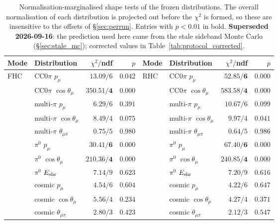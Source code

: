 \documentclass[11pt,a4paper]{article}
\begin{document}
\begin{table}[H]
  \centering
  \caption{Normalisation-marginalised shape tests of the frozen distributions. The overall
    normalisation of each distribution is projected out before the $\chi^2$ is formed, so
    these are insensitive to the offsets of \S\ref{sec:perrun}. Entries with $p<0.01$ in
    bold. \textbf{Superseded 2026-09-16}: the prediction used here came from the stale sideband Monte Carlo
    (\S\ref{sec:stale_mc}); corrected values in Table~\ref{tab:protocol_corrected}.}
  \label{tab:shape}
  \small
  \begin{tabular}{llrr|llrr}
    \toprule
    Mode & Distribution & $\chi^2/$ndf & $p$ & Mode & Distribution & $\chi^2/$ndf & $p$ \\
    \midrule
    FHC & CC$0\pi$ $p_\mu$          & $13.09/6$  & $0.042$ & RHC & CC$0\pi$ $p_\mu$          & $\mathbf{52.85/6}$  & $\mathbf{0.000}$ \\
        & CC$0\pi$ $\cos\theta_\mu$ & $\mathbf{350.51/4}$ & $\mathbf{0.000}$ &  & CC$0\pi$ $\cos\theta_\mu$ & $\mathbf{583.58/4}$ & $\mathbf{0.000}$ \\
        & multi-$\pi$ $p_\mu$       & $6.29/6$   & $0.391$ &     & multi-$\pi$ $p_\mu$       & $10.67/6$  & $0.099$ \\
        & multi-$\pi$ $\cos\theta_\mu$ & $8.49/4$ & $0.075$ &    & multi-$\pi$ $\cos\theta_\mu$ & $9.97/4$ & $0.041$ \\
        & multi-$\pi$ $\theta_{\mu\pi}$ & $0.75/5$ & $0.980$ &   & multi-$\pi$ $\theta_{\mu\pi}$ & $0.64/5$ & $0.986$ \\
        & $\pi^0$ $p_\mu$           & $\mathbf{30.41/6}$ & $\mathbf{0.000}$ & & $\pi^0$ $p_\mu$ & $\mathbf{67.40/6}$ & $\mathbf{0.000}$ \\
        & $\pi^0$ $\cos\theta_\mu$  & $\mathbf{210.36/4}$ & $\mathbf{0.000}$ & & $\pi^0$ $\cos\theta_\mu$ & $\mathbf{240.85/4}$ & $\mathbf{0.000}$ \\
        & $\pi^0$ $E_{\rm shr}$     & $7.14/9$   & $0.623$ &     & $\pi^0$ $E_{\rm shr}$     & $7.20/9$   & $0.616$ \\
        & cosmic $p_\mu$            & $4.54/6$   & $0.604$ &     & cosmic $p_\mu$            & $4.22/6$   & $0.647$ \\
        & cosmic $\cos\theta_\mu$   & $5.56/4$   & $0.234$ &     & cosmic $\cos\theta_\mu$   & $4.27/4$   & $0.371$ \\
        & cosmic $\theta_{\mu\pi}$  & $2.80/3$   & $0.423$ &     & cosmic $\theta_{\mu\pi}$  & $2.12/3$   & $0.547$ \\
    \bottomrule
  \end{tabular}
\end{table}
\end{document}
